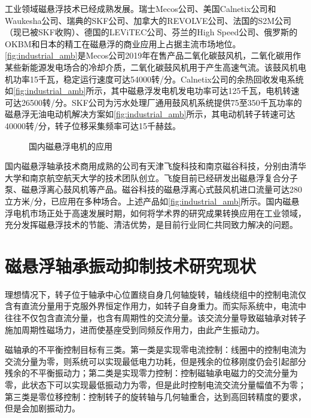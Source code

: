 \documentclass[
  lang=cn,
  degree=master,
  openany,oneside
]{nuaathesis}
\begin{document}
工业领域磁悬浮技术已经成熟发展。瑞士Mecos公司、美国Calnetix公司和Waukesha公司、瑞典的SKF公司、加拿大的REVOLVE公司、法国的S2M公司（现已被SKF收购）、德国的LEViTEC公司、芬兰的High Speed公司、俄罗斯的OKBM和日本的精工在磁悬浮的商业应用上占据主流市场地位。\autoref{fig:industrial_amb}是Mecos公司2019年在售产品二氧化碳鼓风机，二氧化碳用作某些新能源发电场合的冷却介质，二氧化碳鼓风机用于产生高速气流。该鼓风机电机功率15千瓦，稳定运行速度可达54000转/分。Calnetix公司的余热回收发电系统如\autoref{fig:industrial_amb}所示，其中磁悬浮发电机发电功率可达125千瓦，电机转速可达26500转/分。SKF公司为污水处理厂通用鼓风机系统提供75至350千瓦功率的磁悬浮无油电动机解决方案如\autoref{fig:industrial_amb}所示，其电动机转子转速可达40000转/分，转子位移采集频率可达15千赫兹。

\begin{figure}[h!]
  \quad
  \quad
  \caption[国内磁悬浮电机的应用]{国内磁悬浮电机的应用\label{fig:industrial_amb_cn}}
\end{figure}

国内磁悬浮轴承技术商用成熟的公司有天津飞旋科技和南京磁谷科技，分别由清华大学和南京航空航天大学的技术团队创立。飞旋目前已经研发出磁悬浮复合分子泵、磁悬浮离心鼓风机等产品。磁谷科技的磁悬浮离心式鼓风机进口流量可达280立方米/分，已应用在多种场合。上述产品如\autoref{fig:industrial_amb}所示。国内磁悬浮电机市场正处于高速发展时期，如何将学术界的研究成果转换应用在工业领域，充分发挥磁悬浮技术的节能、清洁优势，是目前行业同仁共同致力解决的问题。

\section{磁悬浮轴承振动抑制技术研究现状}
理想情况下，转子位于轴承中心位置绕自身几何轴旋转，轴线绕组中的控制电流仅含有直流分量用于克服外界恒定作用力，如转子自身重力。而实际系统中，电流中往往不仅包含直流分量，也含有周期性的交流分量。该交流分量导致磁轴承对转子施加周期性磁场力，进而使基座受到同频反作用力，由此产生振动力。

磁轴承的不平衡控制目标有三类。第一类是实现零电流控制：线圈中的控制电流为交流分量为零，则系统可以实现最低电力功耗，但是残余的位移刚度仍会引起部分残余的不平衡振动力；第二类是实现零力控制：控制磁轴承电磁力的交流分量为零，此状态下可以实现最低振动力为零，但是此时控制电流交流分量幅值不为零；第三类是零位移控制：控制转子的旋转轴与几何轴重合，达到高回转精度的要求，但是会加剧振动力。
\end{document}

